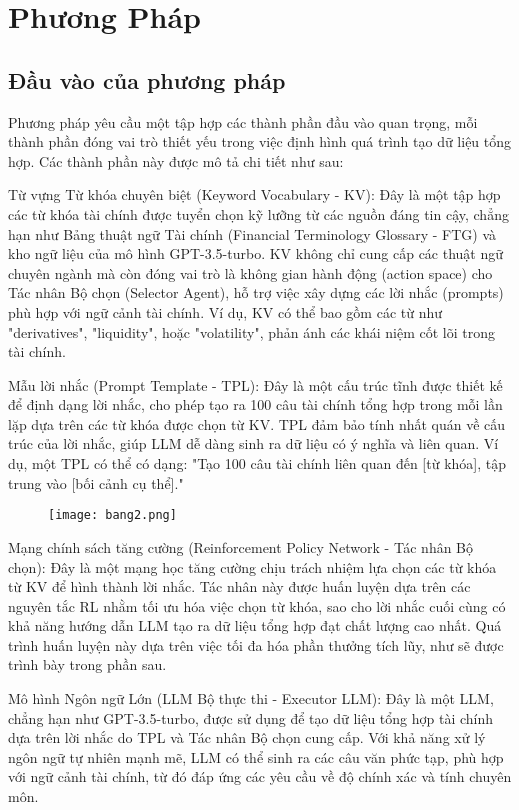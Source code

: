 \documentclass[a4paper,10pt]{article}
\begin{document}
\section{Phương Pháp}
\subsection{Đầu vào của phương pháp}

Phương pháp yêu cầu một tập hợp các thành phần đầu vào quan trọng, mỗi thành phần đóng vai trò thiết yếu trong việc định hình quá trình tạo dữ liệu tổng hợp. Các thành phần này được mô tả chi tiết như sau:

Từ vựng Từ khóa chuyên biệt (Keyword Vocabulary - KV): Đây là một tập hợp các từ khóa tài chính được tuyển chọn kỹ lưỡng từ các nguồn đáng tin cậy, chẳng hạn như Bảng thuật ngữ Tài chính (Financial Terminology Glossary - FTG) và kho ngữ liệu của mô hình GPT-3.5-turbo. KV không chỉ cung cấp các thuật ngữ chuyên ngành mà còn đóng vai trò là không gian hành động (action space) cho Tác nhân Bộ chọn (Selector Agent), hỗ trợ việc xây dựng các lời nhắc (prompts) phù hợp với ngữ cảnh tài chính. Ví dụ, KV có thể bao gồm các từ như "derivatives", "liquidity", hoặc "volatility", phản ánh các khái niệm cốt lõi trong tài chính.


Mẫu lời nhắc (Prompt Template - TPL): Đây là một cấu trúc tĩnh được thiết kế để định dạng lời nhắc, cho phép tạo ra 100 câu tài chính tổng hợp trong mỗi lần lặp dựa trên các từ khóa được chọn từ KV. TPL đảm bảo tính nhất quán về cấu trúc của lời nhắc, giúp LLM dễ dàng sinh ra dữ liệu có ý nghĩa và liên quan. Ví dụ, một TPL có thể có dạng: "Tạo 100 câu tài chính liên quan đến [từ khóa], tập trung vào [bối cảnh cụ thể]."
\begin{figure}[h]
    \centering
    \texttt{[image: bang2.png]}
    \caption{}
    \label{fig:label_anh}
\end{figure}

Mạng chính sách tăng cường (Reinforcement Policy Network - Tác nhân Bộ chọn): Đây là một mạng học tăng cường chịu trách nhiệm lựa chọn các từ khóa từ KV để hình thành lời nhắc. Tác nhân này được huấn luyện dựa trên các nguyên tắc RL nhằm tối ưu hóa việc chọn từ khóa, sao cho lời nhắc cuối cùng có khả năng hướng dẫn LLM tạo ra dữ liệu tổng hợp đạt chất lượng cao nhất. Quá trình huấn luyện này dựa trên việc tối đa hóa phần thưởng tích lũy, như sẽ được trình bày trong phần sau.

Mô hình Ngôn ngữ Lớn (LLM Bộ thực thi - Executor LLM): Đây là một LLM, chẳng hạn như GPT-3.5-turbo, được sử dụng để tạo dữ liệu tổng hợp tài chính dựa trên lời nhắc do TPL và Tác nhân Bộ chọn cung cấp. Với khả năng xử lý ngôn ngữ tự nhiên mạnh mẽ, LLM có thể sinh ra các câu văn phức tạp, phù hợp với ngữ cảnh tài chính, từ đó đáp ứng các yêu cầu về độ chính xác và tính chuyên môn.
\end{document}
